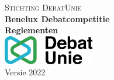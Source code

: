 

\begin{titlepage}

\newcommand{\HRule}{\rule{\linewidth}{0.5mm}}

\center
\textsc{\LARGE Stichting DebatUnie}\\[1.5cm]

{ \huge \bfseries Benelux Debatcompetitie }\\[0.4cm]
{ \huge \bfseries Reglementen}\\[10cm]

\includegraphics[width=150px, keepaspectratio]{Functional/logoDebatUnie.jpg}\\[8cm]

{Versie 2022}
\vfill

\end{titlepage}